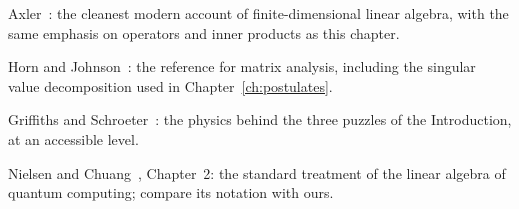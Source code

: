 \begin{furtherreading}
  \item Axler~\cite{axler2015}: the cleanest modern account of finite-dimensional linear algebra, with the same emphasis on operators and inner products as this chapter.
  \item Horn and Johnson~\cite{horn2013}: the reference for matrix analysis, including the singular value decomposition used in Chapter~\ref{ch:postulates}.
  \item Griffiths and Schroeter~\cite{griffiths2018}: the physics behind the three puzzles of the Introduction, at an accessible level.
  \item Nielsen and Chuang~\cite{nielsenchuang2010}, Chapter~2: the standard treatment of the linear algebra of quantum computing; compare its notation with ours.
\end{furtherreading}
